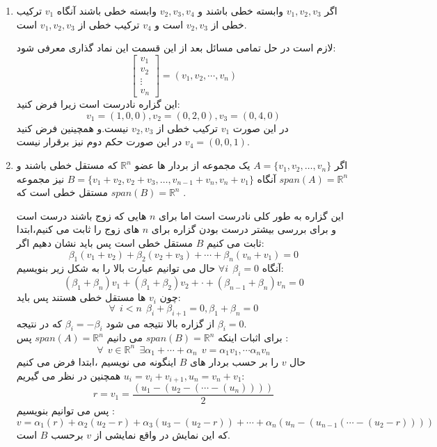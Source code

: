 \documentclass{article}
\begin{document}
\begin{enumerate}
\item
اگر 
$v_1,v_2,v_3$
وابسته خطی باشند و 
$v_2,v_3,v_4$
وابسته خطی باشند آنگاه 
$v_1$
ترکیب خطی از 
$v_2,v_3$
است و 
$v_4$
ترکیب خطی از 
$v_1,v_2,v_3$
است.
\begin{حل}
	لازم است در حل تمامی مسائل بعد از این قسمت این نماد گذاری معرفی شود:
	$$\begin{bmatrix}
	v_1\\
	v_2\\
	\vdots\\
	v_n
		\end{bmatrix}=(v_1,v_2,\cdots,v_n)$$
	این گزاره نادرست است زیرا فرض کنید:
	$$v_1=(1,0,0),v_2=(0,2,0),v_3=(0,4,0)$$
	در این صورت 
	$v_1$
	ترکیب خطی از 
	$v_2,v_3$
	نیست.و همچینین فرض کنید 
	$v_4=(0,0,1)$
	در این صورت حکم دوم نیز برقرار نیست.
\end{حل}
\item 
اگر 
$A=\{v_1,v_2,\ldots,v_n\}$
یک مجموعه از بردار ها عضو 
$\mathbb{R}^n$
 که مستقل خطی باشند و 
 $span(A)=\mathbb{R}^n$
 آنگاه
 $B=\{v_1+v_2,v_2+v_3,\ldots,v_{n-1}+v_n,v_n+v_1\}$
 نیز مجموعه مستقل خطی است که 
  $span(B)=\mathbb{R}^n$
  .
  \begin{حل}
  	این گزاره به طور کلی نادرست است اما برای 
  	$n$
  	 هایی که زوج باشند درست است و برای بررسی بیشتر درست بودن گزاره برای 
  	 $n$
  	 های زوج را ثابت می کنیم،ابتدا ثابت می کنیم 
  	$B$
  	مستقل خطی است پس باید نشان دهیم اگر:
  	$$\beta_1(v_1+v_2)+\beta_2(v_2+v_3)+\cdots+\beta_n(v_n+v_1)=0$$
  	آنگاه
  	$\forall i \ \ \beta_i=0$
  	حال می توانیم عبارت بالا را به شکل زیر بنویسیم:
  	$$(\beta_1+\beta_n)v_1+(\beta_1+\beta_2)v_2+\cdot+(\beta_{n-1}+\beta_n)v_n=0$$
  	چون 
  	$v_i$
  	ها مستقل خطی هستند پس باید:
  	$$\forall\ \ i<n\ \ \beta_i+\beta_{i+1}=0,\beta_1+\beta_n=0 $$
  	از گزاره بالا نتیجه می شود
  	$\beta_i=-\beta_i$
  	که در نتیجه 
  	$\beta_i=0$.
  	\\
  	برای اثبات اینکه 
  	$span(B)=\mathbb{R}^n$
  	می دانیم 
  	$span(A)=\mathbb{R}^n$
  	پس :
  	$$\forall \ \ v\in\mathbb{R}^n\ \  \exists\alpha_1+\cdots+\alpha_n \ \ v=\alpha_1v_1,\cdots\alpha_nv_n$$
  	حال 
  	$v$
  	را بر حسب بردار های 
  	$B$
  	اینگونه می نویسیم ،ابتدا فرض می کنیم 
  	$u_i=v_i+v_{i+1},u_n=v_n+v_1$
  	همچنین در نظر می گیریم:
  	$$r=v_1=\frac{(u_1-(u_2-(\cdots-(u_n))))}{2}$$
  	پس می توانیم بنویسیم :
  	$$v=\alpha_1(r)+\alpha_2(u_2-r)+\alpha_3(u_3-(u_2-r))+\cdots+\alpha_n(u_n-(u_{n-1}(\cdots-(u_2-r))))$$
  	که این نمایش در واقع نمایشی از 
  	$v$
  	برحسب 
  	$B$
  	است.
  	\end{حل}

\end{enumerate}
\end{document}
